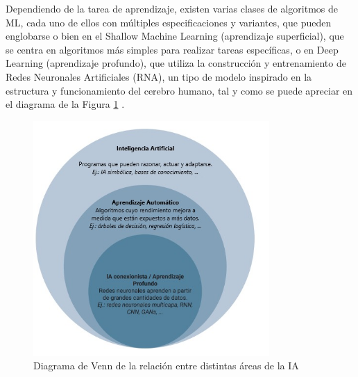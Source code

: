  
 

Dependiendo de la tarea de aprendizaje, existen varias clases de algoritmos de ML, cada uno de ellos con múltiples especificaciones y variantes, que pueden englobarse o bien en el Shallow Machine Learning (aprendizaje superficial), que se centra en algoritmos más simples para realizar tareas específicas, o en Deep Learning (aprendizaje profundo), que utiliza la construcción y entrenamiento de Redes Neuronales Artificiales (RNA), un tipo de modelo inspirado en la estructura y funcionamiento del cerebro humano, tal y como se puede apreciar en el diagrama de la Figura \ref{fig:AlgoritmosML} \cite{Janiesch21}. \\

 \begin{figure} [H]
    \begin{center}
      \includegraphics[width=9cm]{figs/Algoritmos de ML.png}
    \end{center}
    \caption{Diagrama de Venn de la relación entre distintas áreas de la IA}
    \label{fig:AlgoritmosML}
\end{figure}

